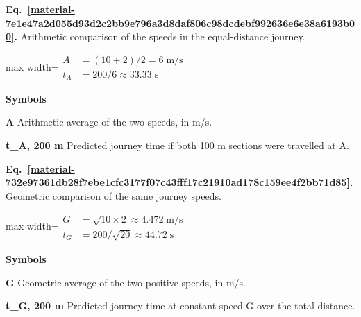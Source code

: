 \documentclass[11pt,a4paper]{article}
\begin{document}
\par\medskip
\begin{samepage}
\label{material-7e1e47a2d055d93d2c2bb9e796a3d8daf806c98dcdebf992636e6e38a6193b00}
\noindent\textbf{Eq.~\ref*{material-7e1e47a2d055d93d2c2bb9e796a3d8daf806c98dcdebf992636e6e38a6193b00}.} Arithmetic comparison of the speeds in the equal-distance journey.\par\nopagebreak
\begin{center}\begin{adjustbox}{max width=\linewidth}$\displaystyle \begin{aligned}A&=(10+2)/2=6\;\mathrm{m/s}\\t_A&=200/6\approx33.33\;\mathrm{s}\end{aligned}$\end{adjustbox}\end{center}

\par\noindent\textbf{Symbols}

\par\noindent\textbf{A} Arithmetic average of the two speeds, in m/s.

\par\noindent\textbf{t\_A, 200 m} Predicted journey time if both 100 m sections were travelled at A.

\end{samepage}
\medskip

\par\medskip
\begin{samepage}
\label{material-732e97361db28f7ebe1cfc3177f07c43fff17c21910ad178c159ee4f2bb71d85}
\noindent\textbf{Eq.~\ref*{material-732e97361db28f7ebe1cfc3177f07c43fff17c21910ad178c159ee4f2bb71d85}.} Geometric comparison of the same journey speeds.\par\nopagebreak
\begin{center}\begin{adjustbox}{max width=\linewidth}$\displaystyle \begin{aligned}G&=\sqrt{10\times2}\approx4.472\;\mathrm{m/s}\\t_G&=200/\sqrt{20}\approx44.72\;\mathrm{s}\end{aligned}$\end{adjustbox}\end{center}

\par\noindent\textbf{Symbols}

\par\noindent\textbf{G} Geometric average of the two positive speeds, in m/s.

\par\noindent\textbf{t\_G, 200 m} Predicted journey time at constant speed G over the total distance.

\end{samepage}
\medskip
\end{document}
